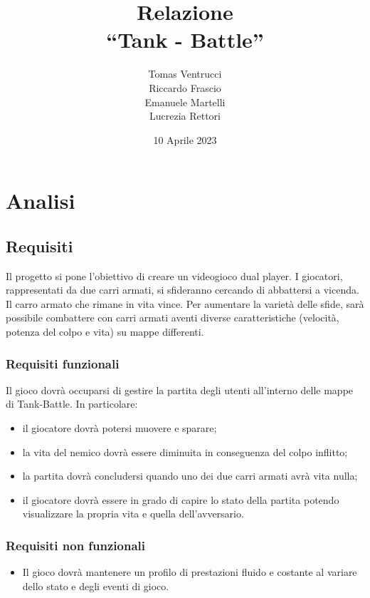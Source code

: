 \documentclass[a4paper,12pt]{report}
\title{Relazione \\``Tank - Battle''}
\author{Tomas Ventrucci \\Riccardo Frascio \\Emanuele Martelli \\Lucrezia Rettori}
\date{10 Aprile 2023}
\begin{document}
\maketitle

\tableofcontents

\chapter{Analisi}

\section{Requisiti}
Il progetto si pone l’obiettivo di creare un videogioco dual player. I giocatori, rappresentati da due carri armati, si sfideranno cercando di abbattersi a vicenda. Il carro armato che rimane in vita vince. Per aumentare la varietà delle sfide, sarà possibile combattere con carri armati aventi diverse caratteristiche (velocità, potenza del colpo e vita) su mappe differenti.

\subsection*{Requisiti funzionali}
Il gioco dovrà occuparsi di gestire la partita degli utenti all’interno delle mappe di Tank-Battle. In particolare:
    \begin{itemize}
        \item il giocatore dovrà potersi muovere e sparare;
        \item la vita del nemico dovrà essere diminuita in conseguenza del colpo inflitto;
        \item la partita dovrà concludersi quando uno dei due carri armati avrà vita nulla;
        \item il giocatore dovrà essere in grado di capire lo stato della partita potendo visualizzare la propria vita e quella dell'avversario.
    \end{itemize}
\subsection*{Requisiti non funzionali}
\begin{itemize}
	\item Il gioco dovrà mantenere un profilo di prestazioni fluido e costante al variare dello stato e degli eventi di gioco.
\end{itemize}
\newpage
\end{document}
